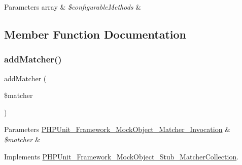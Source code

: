 \begin{DoxyParams}[1]{Parameters}
array & {\em \$configurable\+Methods} & \\
\hline
\end{DoxyParams}


\subsection{Member Function Documentation}
\mbox{\label{class_p_h_p_unit___framework___mock_object___invocation_mocker_aa69f965014eff38ff4c86a3e10a5420a}} 
\subsubsection{\texorpdfstring{add\+Matcher()}{addMatcher()}}
{\footnotesize\ttfamily add\+Matcher (\begin{DoxyParamCaption}\item[{\mbox{\hyperlink{interface_p_h_p_unit___framework___mock_object___matcher___invocation}{P\+H\+P\+Unit\+\_\+\+Framework\+\_\+\+Mock\+Object\+\_\+\+Matcher\+\_\+\+Invocation}}}]{\$matcher }\end{DoxyParamCaption})}


\begin{DoxyParams}[1]{Parameters}
\mbox{\hyperlink{interface_p_h_p_unit___framework___mock_object___matcher___invocation}{P\+H\+P\+Unit\+\_\+\+Framework\+\_\+\+Mock\+Object\+\_\+\+Matcher\+\_\+\+Invocation}} & {\em \$matcher} & \\
\hline
\end{DoxyParams}


Implements \mbox{\hyperlink{interface_p_h_p_unit___framework___mock_object___stub___matcher_collection_aa69f965014eff38ff4c86a3e10a5420a}{P\+H\+P\+Unit\+\_\+\+Framework\+\_\+\+Mock\+Object\+\_\+\+Stub\+\_\+\+Matcher\+Collection}}.

\mbox{\label{class_p_h_p_unit___framework___mock_object___invocation_mocker_a1776bc980be5adac247b2a4ab1152128}} 
